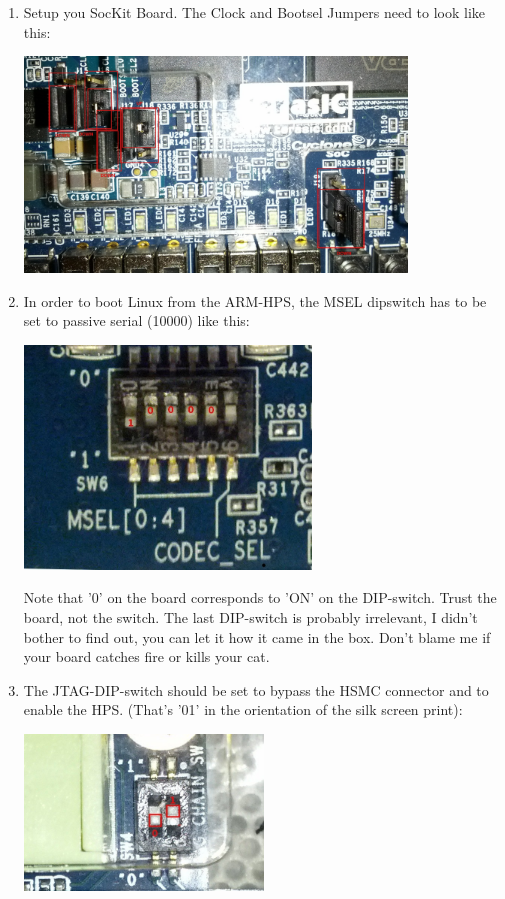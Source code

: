 \documentclass[twoside]{article}
\begin{document}
\begin{enumerate}
\item Setup you SocKit Board. The Clock and Bootsel Jumpers need to
  look like this:

\includegraphics[width=0.8\textwidth]{boardjumpers.jpeg}

\item In order to boot Linux from the ARM-HPS, the MSEL dipswitch has
  to be set to passive serial (10000) like this:

\includegraphics[width=0.6\textwidth]{dipswitch.jpeg}

Note that '0' on the board corresponds to 'ON' on the
DIP-switch. Trust the board, not the switch. The last DIP-switch is
probably irrelevant, I didn't bother to find out, you can let it how
it came in the box. Don't blame me if your board catches fire or
kills your cat.

\item The JTAG-DIP-switch should be set to bypass the HSMC connector
  and to enable the HPS. (That's '01' in the orientation of the silk
  screen print):

\includegraphics[width=0.5\textwidth]{jtagswitch.jpeg}


\end{enumerate}
\end{document}

